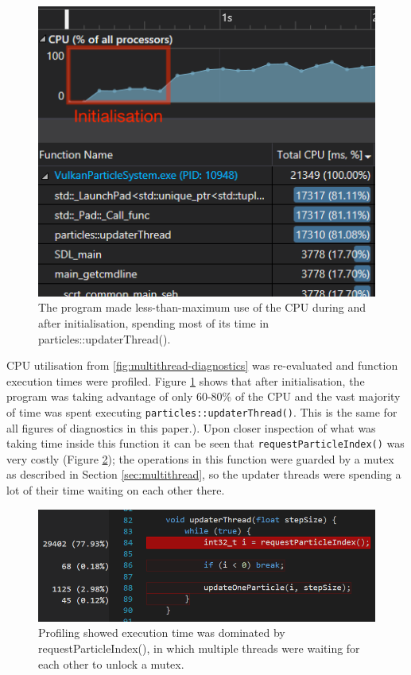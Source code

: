 \documentclass[11pt, a4paper, twocolumn]{article}
\begin{document}
\begin{figure}[h]
\includegraphics[width=\linewidth]{rng-mutex-diag}
\caption{The program made less-than-maximum use of the CPU during and after initialisation, spending most of its time in particles::updaterThread().}
\label{fig:rng-mutex-diag}
\end{figure}

CPU utilisation from \ref{fig:multithread-diagnostics} was re-evaluated and function execution times were profiled. Figure \ref{fig:rng-mutex-diag} shows that after initialisation, the program was taking advantage of only 60-80\% of the CPU and the vast majority of time was spent executing \verb|particles::updaterThread()|. This is the same for all figures of diagnostics in this paper.). Upon closer inspection of what was taking time inside this function it can be seen that \verb|requestParticleIndex()| was very costly (Figure \ref{fig:updaterthread-request}); the operations in this function were guarded by a mutex as described in Section \ref{sec:multithread}, so the updater threads were spending a lot of their time waiting on each other there.

\begin{figure}[h]
\includegraphics[width=\linewidth]{updaterthread-request}
\caption{Profiling showed execution time was dominated by requestParticleIndex(), in which multiple threads were waiting for each other to unlock a mutex.}
\label{fig:updaterthread-request}
\end{figure}
\end{document}
